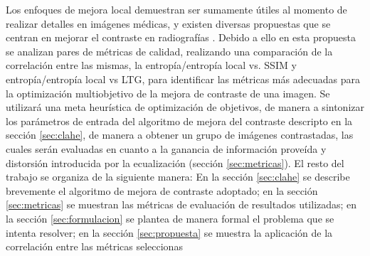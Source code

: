 \documentclass[spanish,twocolumn]{article}
\begin{document}
Los enfoques de mejora local demuestran ser sumamente útiles al momento de realizar detalles en imágenes médicas, y existen diversas propuestas que se centran en mejorar el contraste en radiografías \cite{1625082,4712472,5360176}. Debido a ello en esta  propuesta se analizan pares de métricas de calidad, realizando una comparación de la correlación entre las mismas, la entropía/entropía local vs. SSIM y entropía/entropía local vs LTG, para identificar las métricas más adecuadas para la optimización multiobjetivo de la mejora de contraste de una imagen. 
Se utilizará una meta heurística de optimización de objetivos, de manera a sintonizar los parámetros de entrada del algoritmo de mejora del contraste descripto en la sección \ref{sec:clahe}, de manera a obtener un grupo de imágenes contrastadas, las cuales serán evaluadas en cuanto a la ganancia de información proveída y distorsión introducida por la ecualización (sección \ref{sec:metricas}).
El resto del trabajo se organiza de la siguiente manera: En la sección \ref{sec:clahe} se describe brevemente el algoritmo de mejora de contraste adoptado; en la sección \ref{sec:metricas} se muestran las métricas de evaluación de resultados utilizadas; en la sección \ref{sec:formulacion} se plantea de manera formal el problema que se intenta resolver; en la sección \ref{sec:propuesta} se muestra la aplicación de la correlación entre las métricas seleccionas %



\end{document}

